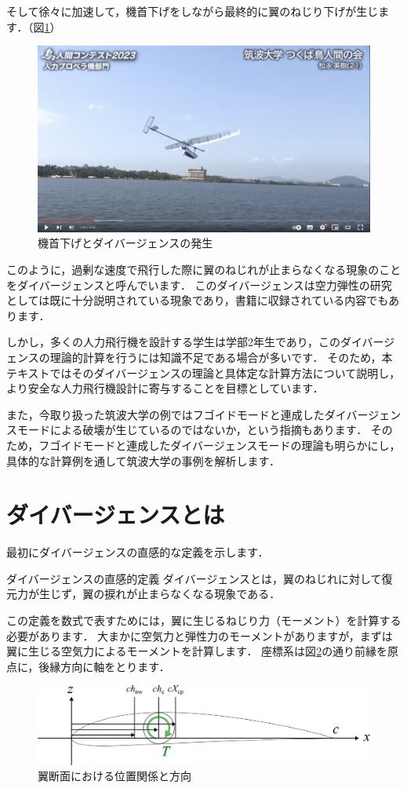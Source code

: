 \documentclass{jarticle}
\begin{document}
そして徐々に加速して，機首下げをしながら最終的に翼のねじり下げが生じます．（図\ref{tsukuba3}）
\begin{figure}[H]
    \centering
    \includegraphics[width=0.7\linewidth]{image/tsukuba0126.png}
    \caption{機首下げとダイバージェンスの発生}
    \label{tsukuba3}
\end{figure}

このように，過剰な速度で飛行した際に翼のねじれが止まらなくなる現象のことをダイバージェンスと呼んでいます．
このダイバージェンスは空力弾性の研究としては既に十分説明されている現象であり，書籍に収録されている内容でもあります\cite{2019}．

しかし，多くの人力飛行機を設計する学生は学部2年生であり，このダイバージェンスの理論的計算を行うには知識不足である場合が多いです．
そのため，本テキストではそのダイバージェンスの理論と具体定な計算方法について説明し，より安全な人力飛行機設計に寄与することを目標としています．

また，今取り扱った筑波大学の例ではフゴイドモードと連成したダイバージェンスモード\cite{takasaki}による破壊が生じているのではないか，という指摘もあります．
そのため，フゴイドモードと連成したダイバージェンスモードの理論も明らかにし，具体的な計算例を通して筑波大学の事例を解析します．

\newpage

\section{ダイバージェンスとは}

最初にダイバージェンスの直感的な定義を示します．
\begin{itembox}[l]{ダイバージェンスの直感的定義}
    ダイバージェンスとは，翼のねじれに対して復元力が生じず，翼の捩れが止まらなくなる現象である．
\end{itembox}

この定義を数式で表すためには，翼に生じるねじり力（モーメント）を計算する必要があります．
大まかに空気力と弾性力のモーメントがありますが，まずは翼に生じる空気力によるモーメントを計算します．
座標系は図\ref{chod}の通り前縁を原点に，後縁方向に軸をとります．
\begin{figure}[H]
    \centering
    \includegraphics[width=0.7\linewidth]{image/airfoil.pdf}
    \caption{翼断面における位置関係と方向}
    \label{chod}
\end{figure}
\end{document}
